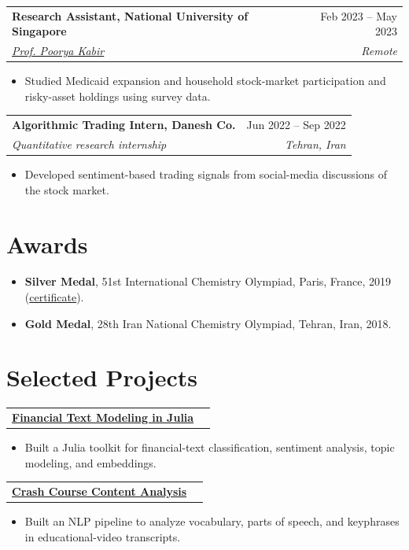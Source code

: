 \documentclass[letterpaper,11pt]{article}
\makeatletter
\newcommand{\entry}[4]{
  \par\addvspace{4pt}
  \begin{tabularx}{\textwidth}{@{}Xr@{}}
    \normalsize\textbf{#1} & \normalsize #2 \\[1pt]
    \textit{\small #3} & \textit{\small #4}
  \end{tabularx}\par\vspace{-3pt}
}
\newlength{\projectgap}
\newcommand{\projectentry}[3][\projectgap]{
  \par\addvspace{#1}
  \begin{tabularx}{\textwidth}{@{}Xr@{}}
    \normalsize\textbf{#2} & \normalsize #3
  \end{tabularx}\vspace{-1pt}
}
\newenvironment{cvitems}[1][3pt]
  {\small\begin{itemize}[leftmargin=0.55cm, itemsep=3pt, parsep=0pt, topsep=#1]}
  {\end{itemize}\vspace{-5pt}}
\newcommand{\link}[2]{\href{#1}{\textcolor{cvblue}{#2}}}
\makeatother
\begin{document}
\entry
  {Research Assistant, National University of Singapore}{Feb 2023 -- May 2023}
  {\link{https://discovery.nus.edu.sg/18110-poorya-kabir/about}{Prof. Poorya Kabir}}
  {Remote}
\begin{cvitems}
  \item Studied Medicaid expansion and household stock-market participation and risky-asset holdings using survey data.
\end{cvitems}

\entry
  {Algorithmic Trading Intern, Danesh Co.}{Jun 2022 -- Sep 2022}
  {Quantitative research internship}
  {Tehran, Iran}
\begin{cvitems}
  \item Developed sentiment-based trading signals from social-media discussions of the stock market.
\end{cvitems}

\section{Awards}

\begin{cvitems}
  \item \textbf{Silver Medal}, 51st International Chemistry Olympiad, Paris, France, 2019 (\link{https://drive.google.com/file/d/1EnjayIUpp0IMVcDCBvyIl645vrPMfKwv/view?usp=sharing}{certificate}).
  \item \textbf{Gold Medal}, 28th Iran National Chemistry Olympiad, Tehran, Iran, 2018.
\end{cvitems}

\section{Selected Projects}
\begingroup
\setlength{\projectgap}{9pt}

\projectentry[0pt]{\link{https://github.com/AmBadAl/financial-text-modeling-julia}{Financial Text Modeling in Julia}}{}
\begin{cvitems}
  \item Built a Julia toolkit for financial-text classification, sentiment analysis, topic modeling, and embeddings.
\end{cvitems}

\projectentry{\link{https://github.com/AmBadAl/crash-course-content-analysis}{Crash Course Content Analysis}}{}
\begin{cvitems}
  \item Built an NLP pipeline to analyze vocabulary, parts of speech, and keyphrases in educational-video transcripts.
\end{cvitems}
\end{document}
